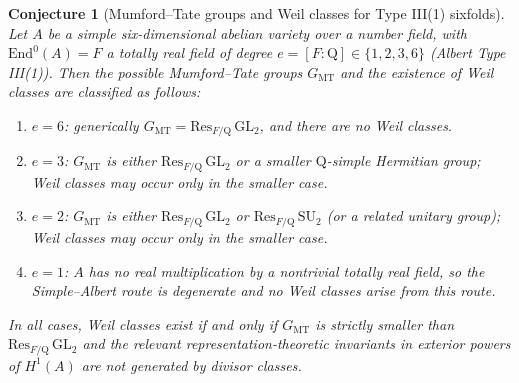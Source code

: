 \documentclass{article}
\newcommand{\mathbb}[1]{\mathrm{#1}}
\newtheorem{conjecture}{Conjecture}
\begin{document}
\begin{conjecture}[Mumford--Tate groups and Weil classes for Type III(1) sixfolds]
Let $A$ be a simple six-dimensional abelian variety over a number field, with $\mathrm{End}^0(A) = F$ a totally real field of degree $e = [F:\mathbb{Q}] \in \{1,2,3,6\}$ (Albert Type III(1)). Then the possible Mumford--Tate groups $G_{\mathrm{MT}}$ and the existence of Weil classes are classified as follows:
\begin{enumerate}
  \item[(i)] $e = 6$: generically $G_{\mathrm{MT}} = \mathrm{Res}_{F/\mathbb{Q}}\,\mathrm{GL}_2$, and there are no Weil classes.
  \item[(ii)] $e = 3$: $G_{\mathrm{MT}}$ is either $\mathrm{Res}_{F/\mathbb{Q}}\,\mathrm{GL}_2$ or a smaller $\mathbb{Q}$-simple Hermitian group; Weil classes may occur only in the smaller case.
  \item[(iii)] $e = 2$: $G_{\mathrm{MT}}$ is either $\mathrm{Res}_{F/\mathbb{Q}}\,\mathrm{GL}_2$ or $\mathrm{Res}_{F/\mathbb{Q}}\,\mathrm{SU}_2$ (or a related unitary group); Weil classes may occur only in the smaller case.
  \item[(iv)] $e = 1$: $A$ has no real multiplication by a nontrivial totally real field, so the Simple--Albert route is degenerate and no Weil classes arise from this route.
\end{enumerate}
In all cases, Weil classes exist if and only if $G_{\mathrm{MT}}$ is strictly smaller than $\mathrm{Res}_{F/\mathbb{Q}}\,\mathrm{GL}_2$ and the relevant representation-theoretic invariants in exterior powers of $H^1(A)$ are not generated by divisor classes.
\end{conjecture}
\end{document}
